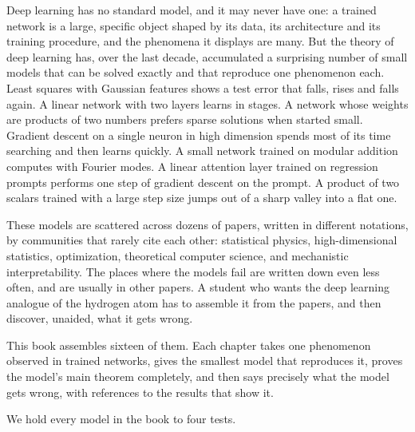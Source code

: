 \begin{refsection}

Deep learning has no standard model, and it may never have one: a trained network is a large, specific object shaped by its data, its architecture and its training procedure, and the phenomena it displays are many. But the theory of deep learning has, over the last decade, accumulated a surprising number of small models that can be solved exactly and that reproduce one phenomenon each. Least squares with Gaussian features shows a test error that falls, rises and falls again. A linear network with two layers learns in stages. A network whose weights are products of two numbers prefers sparse solutions when started small. Gradient descent on a single neuron in high dimension spends most of its time searching and then learns quickly. A small network trained on modular addition computes with Fourier modes. A linear attention layer trained on regression prompts performs one step of gradient descent on the prompt. A product of two scalars trained with a large step size jumps out of a sharp valley into a flat one.

These models are scattered across dozens of papers, written in different notations, by communities that rarely cite each other: statistical physics, high-dimensional statistics, optimization, theoretical computer science, and mechanistic interpretability. The places where the models fail are written down even less often, and are usually in other papers. A student who wants the deep learning analogue of the hydrogen atom has to assemble it from the papers, and then discover, unaided, what it gets wrong.

This book assembles sixteen of them. Each chapter takes one phenomenon observed in trained networks, gives the smallest model that reproduces it, proves the model's main theorem completely, and then says precisely what the model gets wrong, with references to the results that show it.


We hold every model in the book to four tests.


\end{refsection}
